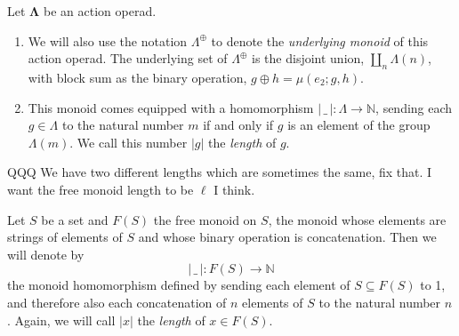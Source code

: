 \documentclass{amsbook} %
\newcommand{\ML}{\mathbf{\Lambda}}
\newcommand{\lop}{\Lambda^{\oplus}}
\numberwithin{section}{chapter}
\begin{document}
\begin{Defi} Let $\ML$ be an action operad. 
\begin{enumerate}
\item We will also use the notation $\lop$ to denote the \emph{underlying monoid} of this action operad. The underlying set of $\lop$ is the disjoint union, $\coprod_n \Lambda(n)$, with block sum as the binary operation, $g \oplus h = \mu(e_2; g, h)$.

\item This monoid comes equipped with a homomorphism $| \, \_ \, | : \Lambda \to \mathbb{N}$, sending each $g \in \Lambda$ to the natural number $m$ if and only if $g$ is an element of the group $\Lambda(m)$. We call this number $|g|$ the \emph{length} of $g$.
\end{enumerate}
\end{Defi}

QQQ We have two different lengths which are sometimes the same, fix that. I want the free monoid length to be $\ell$ I think.

\begin{Defi}\label{lengthdef} Let $S$ be a set and $F(S)$ the free monoid on $S$, the monoid whose elements are strings of elements of $S$ and whose binary operation is concatenation. Then we will denote by
\[ | \, \_ \, | : F(S) \to \mathbb{N} \]
the monoid homomorphism defined by sending each element of $S \subseteq F(S)$ to 1, and therefore also each concatenation of $n$ elements of $S$ to the natural number $n$. Again, we will call $|x|$ the \emph{length} of $x \in F(S)$.
\end{Defi}
\end{document}
